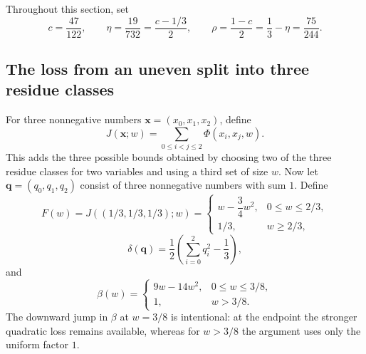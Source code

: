 \documentclass[11pt]{article}
\numberwithin{equation}{section}
\theoremstyle{remark}
\begin{document}
Throughout this section, set
\begin{equation}\label{eq:c-eta-rho}
 c=\frac{47}{122},
 \qquad
 \eta=\frac{19}{732}=\frac{c-1/3}{2},
 \qquad
 \rho=\frac{1-c}{2}=\frac13-\eta=\frac{75}{244}.
\end{equation}
\subsection{The loss from an uneven split into three residue classes}
For three nonnegative numbers $\mathbf x=(x_0,x_1,x_2)$, define
\begin{equation}\label{eq:def-three-class-J}
 J(\mathbf x;w)=\sum_{0\le i<j\le2}\Phi(x_i,x_j,w).
\end{equation}
This adds the three possible bounds obtained by choosing two of the three
residue classes for two variables and using a third set of size $w$.
Now let $\mathbf q=(q_0,q_1,q_2)$ consist of three nonnegative numbers with sum
$1$.  Define
\begin{equation}\label{eq:def-F-delta-beta}
 F(w)=J((1/3,1/3,1/3);w)
 =
 \begin{cases}
 w-\dfrac34w^2,&0\le w\le2/3,\\[1mm]
 1/3,&w\ge2/3,
 \end{cases}
\end{equation}
\begin{equation}\label{eq:def-delta}
 \delta(\mathbf q)=\frac12\left(\sum_{i=0}^2q_i^2-\frac13\right),
\end{equation}
and
\begin{equation}\label{eq:def-beta}
 \beta(w)=
 \begin{cases}
 9w-14w^2,&0\le w\le3/8,\\[1mm]
 1,&w>3/8.
 \end{cases}
\end{equation}
The downward jump in $\beta$ at $w=3/8$ is intentional: at the endpoint the
stronger quadratic loss remains available, whereas for $w>3/8$ the argument
uses only the uniform factor $1$.
\end{document}

